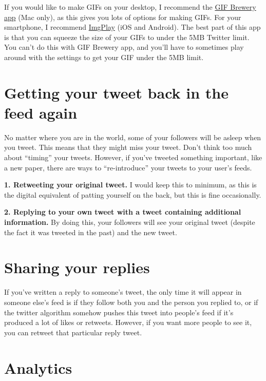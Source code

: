\documentclass[
]{book}
\begin{document}
If you would like to make GIFs on your desktop, I recommend the \href{https://gfycat.com/gifbrewery}{GIF Brewery app} (Mac only), as this gives you lots of options for making GIFs. For your smartphone, I recommend \href{https://imgplay.net/}{ImgPlay} (iOS and Android). The best part of this app is that you can squeeze the size of your GIFs to under the 5MB Twitter limit. You can't do this with GIF Brewery app, and you'll have to sometimes play around with the settings to get your GIF under the 5MB limit.

\hypertarget{getting-your-tweet-back-in-the-feed-again}{%
\section*{Getting your tweet back in the feed again}\label{getting-your-tweet-back-in-the-feed-again}}

No matter where you are in the world, some of your followers will be asleep when you tweet. This means that they might miss your tweet. Don't think too much about ``timing'' your tweets. However, if you've tweeted something important, like a new paper, there are ways to ``re-introduce'' your tweets to your user's feeds.

\textbf{1. Retweeting your original tweet.} I would keep this to minimum, as this is the digital equivalent of patting yourself on the back, but this is fine occasionally.

\textbf{2. Replying to your own tweet with a tweet containing additional information.} By doing this, your followers will see your original tweet (despite the fact it was tweeted in the past) and the new tweet.

\hypertarget{sharing-your-replies}{%
\section*{Sharing your replies}\label{sharing-your-replies}}

If you've written a reply to someone's tweet, the only time it will appear in someone else's feed is if they follow both you and the person you replied to, or if the twitter algorithm somehow pushes this tweet into people's feed if it's produced a lot of likes or retweets. However, if you want more people to see it, you can retweet that particular reply tweet.

\hypertarget{analytics}{%
\section*{Analytics}\label{analytics}}
\end{document}
